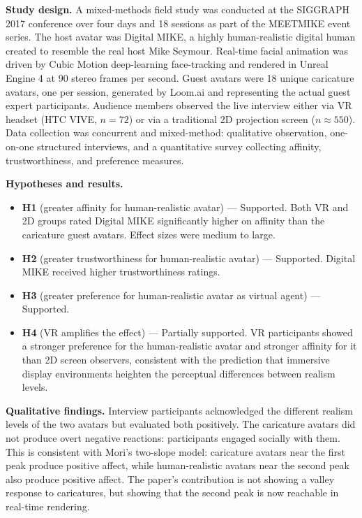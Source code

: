 \documentclass[11pt, a4paper]{article}
\begin{document}
\textbf{Study design.} A mixed-methods field study was conducted at the SIGGRAPH 2017 conference over four days and 18 sessions as part of the MEETMIKE event series. The host avatar was Digital MIKE, a highly human-realistic digital human created to resemble the real host Mike Seymour. Real-time facial animation was driven by Cubic Motion deep-learning face-tracking and rendered in Unreal Engine 4 at 90 stereo frames per second. Guest avatars were 18 unique caricature avatars, one per session, generated by Loom.ai and representing the actual guest expert participants. Audience members observed the live interview either via VR headset (HTC VIVE, $n = 72$) or via a traditional 2D projection screen ($n \approx 550$). Data collection was concurrent and mixed-method: qualitative observation, one-on-one structured interviews, and a quantitative survey collecting affinity, trustworthiness, and preference measures.

\textbf{Hypotheses and results.}

\begin{itemize}[leftmargin=2em]
  \item \textbf{H1} (greater affinity for human-realistic avatar) --- Supported. Both VR and 2D groups rated Digital MIKE significantly higher on affinity than the caricature guest avatars. Effect sizes were medium to large.
  \item \textbf{H2} (greater trustworthiness for human-realistic avatar) --- Supported. Digital MIKE received higher trustworthiness ratings.
  \item \textbf{H3} (greater preference for human-realistic avatar as virtual agent) --- Supported.
  \item \textbf{H4} (VR amplifies the effect) --- Partially supported. VR participants showed a stronger preference for the human-realistic avatar and stronger affinity for it than 2D screen observers, consistent with the prediction that immersive display environments heighten the perceptual differences between realism levels.
\end{itemize}

\textbf{Qualitative findings.} Interview participants acknowledged the different realism levels of the two avatars but evaluated both positively. The caricature avatars did not produce overt negative reactions: participants engaged socially with them. This is consistent with Mori's two-slope model: caricature avatars near the first peak produce positive affect, while human-realistic avatars near the second peak also produce positive affect. The paper's contribution is not showing a valley response to caricatures, but showing that the second peak is now reachable in real-time rendering.
\end{document}
